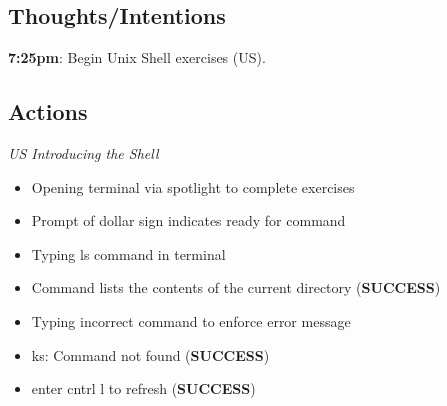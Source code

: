 \documentclass{article}
\begin{document}
\subsection*{Thoughts/Intentions}
\textbf{7:25pm}: Begin Unix Shell exercises (US). 

\subsection{Actions}
\textit{US Introducing the Shell}
\begin{itemize}
\item Opening terminal via spotlight to complete exercises
\item Prompt of dollar sign indicates ready for command
\item Typing ls command in terminal
\item Command lists the contents of the current directory (\textbf{SUCCESS})
\item Typing incorrect command to enforce error message
\item ks: Command not found (\textbf{SUCCESS})
\item enter cntrl l to refresh (\textbf{SUCCESS})
\end{itemize}
\end{document}
